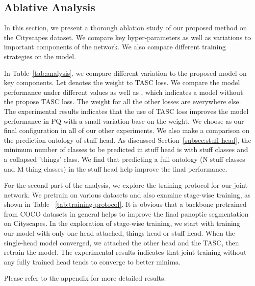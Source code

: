 \documentclass[10pt,twocolumn]{article}
\begin{document}
\subsection{Ablative Analysis\label{subsec:analysis}}
In this section, we present a thorough ablation study of our proposed method on the Cityscapes dataset. We compare key hyper-parameters as well as variations to important components of the network. We also compare different training strategies on the model.

In Table~\ref{tab:analysis}, we compare different variation to the proposed model on key components. Let  denotes the weight to TASC loss. We compare the model performance under different  values as well as , which indicates a model without the propose TASC loss. The weight for all the other losses are  everywhere else. The experimental results indicates that the use of TASC loss improves the model performance in PQ with a small variation base on the weight. We choose  as our final configuration in all of our other experiments. We also make a comparison on the prediction ontology of stuff head. As discussed Section~\ref{subsec:stuff-head}, the minimum number of classes to be predicted in stuff head is  with  stuff classes and a collapsed 'things' class. We find that predicting a full ontology (N stuff classes and M thing classes) in the stuff head help improve the final performance.











For the second part of the analysis, we explore the training protocol for our joint network. We pretrain on various datasets and also examine stage-wise training, as shown in Table ~\ref{tab:training-protocol}. 
It is obvious that a backbone pretrained from COCO datasets in general helps to improve the final panoptic segmentation on Cityscapes.
In the exploration of stage-wise training, we start with training our model with only one head attached, things head or stuff head. When the single-head model converged, we attached the other head and the TASC, then retrain the model. The experimental results indicates that joint training without any fully trained head tends to converge to better minima. 



Please refer to the appendix for more detailed results.
\end{document}
